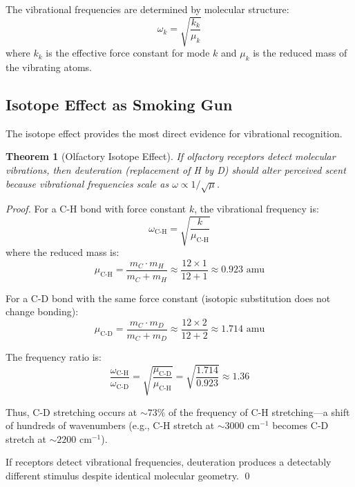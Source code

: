 \documentclass[11pt]{article}
\newtheorem{theorem}{Theorem}[section]
\theoremstyle{remark}
\begin{document}
The vibrational frequencies are determined by molecular structure:
\begin{equation}
\omega_k = \sqrt{\frac{k_k}{\mu_k}}
\end{equation}
where $k_k$ is the effective force constant for mode $k$ and $\mu_k$ is the reduced mass of the vibrating atoms.

\subsection{Isotope Effect as Smoking Gun}

The isotope effect provides the most direct evidence for vibrational recognition.

\begin{theorem}[Olfactory Isotope Effect]
\label{thm:isotope_effect}
If olfactory receptors detect molecular vibrations, then deuteration (replacement of H by D) should alter perceived scent because vibrational frequencies scale as $\omega \propto 1/\sqrt{\mu}$.
\end{theorem}

\begin{proof}
For a C-H bond with force constant $k$, the vibrational frequency is:
\begin{equation}
\omega_{\text{C-H}} = \sqrt{\frac{k}{\mu_{\text{C-H}}}}
\end{equation}
where the reduced mass is:
\begin{equation}
\mu_{\text{C-H}} = \frac{m_C \cdot m_H}{m_C + m_H} \approx \frac{12 \times 1}{12 + 1} \approx 0.923 \text{ amu}
\end{equation}

For a C-D bond with the same force constant (isotopic substitution does not change bonding):
\begin{equation}
\mu_{\text{C-D}} = \frac{m_C \cdot m_D}{m_C + m_D} \approx \frac{12 \times 2}{12 + 2} \approx 1.714 \text{ amu}
\end{equation}

The frequency ratio is:
\begin{equation}
\frac{\omega_{\text{C-H}}}{\omega_{\text{C-D}}} = \sqrt{\frac{\mu_{\text{C-D}}}{\mu_{\text{C-H}}}} = \sqrt{\frac{1.714}{0.923}} \approx 1.36
\end{equation}

Thus, C-D stretching occurs at $\sim 73\%$ of the frequency of C-H stretching—a shift of hundreds of wavenumbers (e.g., C-H stretch at $\sim 3000$ cm$^{-1}$ becomes C-D stretch at $\sim 2200$ cm$^{-1}$).

If receptors detect vibrational frequencies, deuteration produces a detectably different stimulus despite identical molecular geometry. \qed
\end{proof}
\end{document}
